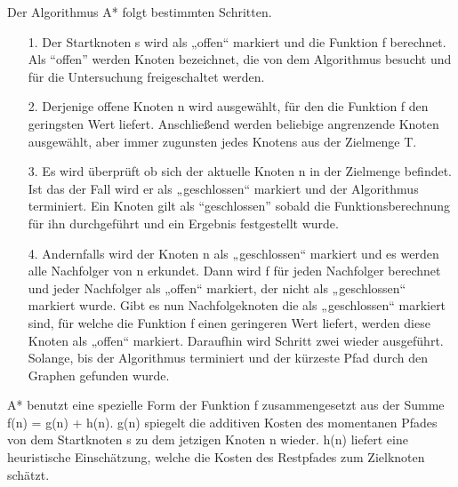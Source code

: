 Der Algorithmus A* folgt bestimmten Schritten. 
\begin{itemize}
\item[1.] Der Startknoten s wird als „offen“ markiert und die Funktion f berechnet. Als “offen” werden Knoten bezeichnet, die von dem Algorithmus besucht und für die Untersuchung freigeschaltet werden.
\item[2.] Derjenige offene Knoten n wird ausgewählt, für den die Funktion f den geringsten Wert liefert. Anschließend werden beliebige angrenzende Knoten ausgewählt, aber immer zugunsten jedes Knotens aus der Zielmenge T.
\item[3.] Es wird überprüft ob sich der aktuelle Knoten n in der Zielmenge befindet. Ist das der Fall wird er als „geschlossen“ markiert und der Algorithmus terminiert. Ein Knoten gilt als “geschlossen” sobald die Funktionsberechnung für ihn durchgeführt und ein Ergebnis festgestellt wurde. 
\item[4.] Andernfalls wird der Knoten n als „geschlossen“ markiert und es werden alle Nachfolger von n erkundet. Dann wird f für jeden Nachfolger berechnet und jeder Nachfolger als „offen“ markiert, der nicht als „geschlossen“ markiert wurde. Gibt es nun Nachfolgeknoten die als „geschlossen“ markiert sind, für welche die Funktion f einen geringeren Wert liefert, werden diese Knoten als „offen“ markiert. Daraufhin wird Schritt zwei wieder ausgeführt. Solange, bis der Algorithmus terminiert und der kürzeste Pfad durch den Graphen gefunden wurde\cite{HartNilssonandRaphael.1968}.
\end{itemize}


A* benutzt eine spezielle Form der Funktion f zusammengesetzt aus der Summe f(n) = g(n) + h(n). g(n) spiegelt die additiven Kosten des momentanen Pfades von dem Startknoten s zu dem jetzigen Knoten n wieder. h(n) liefert eine heuristische Einschätzung, welche die Kosten des Restpfades zum Zielknoten schätzt\cite{RinaDechterandJudeaPearl.1983}.

